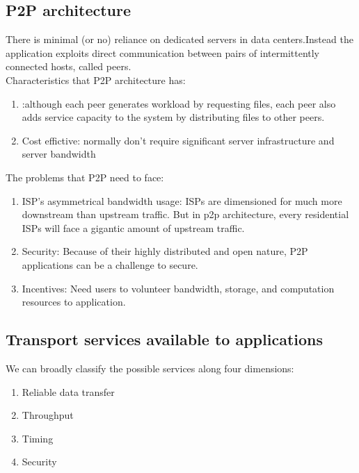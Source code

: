\subsection{P2P architecture}

There is minimal (or no) reliance on dedicated servers in
data centers.Instead the application exploits direct communication between pairs of
intermittently connected hosts, called peers.\\

Characteristics that P2P architecture has:
\begin{enumerate}
    \item {}:although each peer generates
          workload by requesting files, each peer also adds service capacity to the system
          by distributing files to other peers.
    \item Cost effictive: normally don’t require significant server infrastructure and server bandwidth
\end{enumerate}

The problems that P2P need to face:
\begin{enumerate}
    \item ISP's asymmetrical bandwidth usage: ISPs are dimensioned for much more downstream than upstream traffic. But in p2p architecture, every residential ISPs will face a gigantic amount of upstream traffic.
    \item Security: Because of their highly distributed and open nature, P2P applications can be a challenge to secure.
    \item Incentives: Need users to volunteer bandwidth, storage, and computation resources to application.
\end{enumerate}

\subsection{Transport services available to applications}

We can broadly classify the possible services along four dimensions:
\begin{enumerate}
    \item Reliable data transfer
    \item Throughput
    \item Timing
    \item Security
\end{enumerate}





